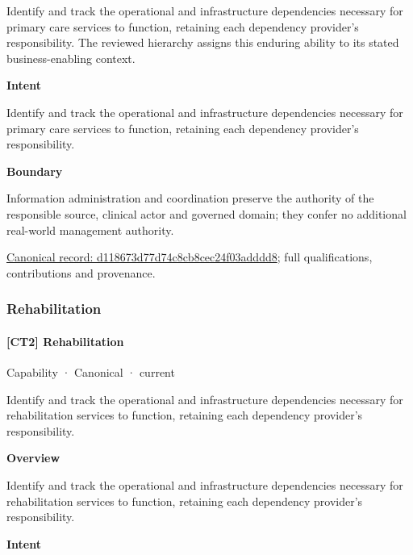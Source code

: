 Identify and track the operational and infrastructure dependencies necessary for primary care services to function, retaining each dependency provider's responsibility. The reviewed hierarchy assigns this enduring ability to its stated business-enabling context.



\textbf{Intent}



Identify and track the operational and infrastructure dependencies necessary for primary care services to function, retaining each dependency provider's responsibility.



\textbf{Boundary}



Information administration and coordination preserve the authority of the responsible source, clinical actor and governed domain; they confer no additional real-world management authority.


{\footnotesize \href{../../../../continuum/strategy/capability/d118673d77d74c8cb8cec24f03adddd8.md}{Canonical record: d118673d77d74c8cb8cec24f03adddd8}; full qualifications, contributions and provenance.}\par
\subsubsection{Rehabilitation}

\paragraph{[CT2] Rehabilitation}

\label{element:99ed51abcc5e4e8ba3b3d0161b17544a}
{\small Capability · Canonical · current}\par

Identify and track the operational and infrastructure dependencies necessary for rehabilitation services to function, retaining each dependency provider's responsibility.



\textbf{Overview}



Identify and track the operational and infrastructure dependencies necessary for rehabilitation services to function, retaining each dependency provider's responsibility.



\textbf{Intent}



